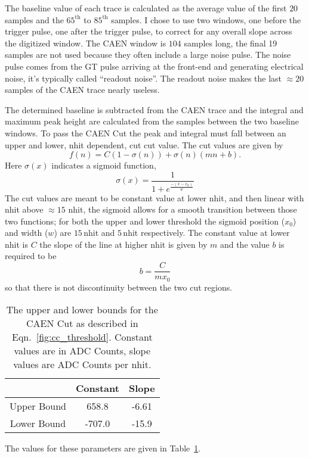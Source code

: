 The baseline value of each trace is calculated as the average value of the first
$20$ samples and the $65^{\text{th}}$ to $85^{\text{th}}$ samples.
I chose to use two windows, one before the trigger pulse, one after the trigger pulse, to
correct for any overall slope across the digitized window.
The CAEN window is $104$ samples long, the final 19 samples are not used because they often
include a large noise pulse.
The noise pulse comes from the GT pulse arriving at the front-end and generating electrical noise,
it's typically called ``readout noise''.
The readout noise makes the last $\approx20$ samples of the CAEN trace nearly
useless.

The determined baseline is subtracted from the CAEN trace and the integral and maximum
peak height are calculated from the samples between the two baseline windows.
To pass the CAEN Cut the peak and integral must fall between an upper and lower, nhit dependent,
cut cut value.
The cut values are given by
\begin{equation}
    f(n) = C\left(1-\sigma(n)\right) + \sigma(n)\left(mn+b\right)\text{.}
    \label{eqn:cc_threshold}
\end{equation}
Here $\sigma(x)$ indicates a sigmoid function,
\begin{equation}
    \sigma(x) = \frac{1}{1+e^{\frac{-(x-x_{0})}{w}}}
\end{equation}
The cut values are meant to be constant value at lower nhit, and then
linear with nhit above $\approx15$ nhit, the sigmoid allows for a smooth
transition between those two functions; for both the upper and lower threshold
the sigmoid position ($x_{0}$) and width ($w$) are $15$\,nhit and $5$\,nhit respectively.
The constant value at lower nhit is $C$ the slope of the line at higher nhit
is given by $m$ and the value $b$ is required to be
\begin{equation}
    b = \frac{C}{mx_{0}}
\end{equation}
so that there is not discontinuity between the two cut regions.
\begin{table}
    \centering
  \begin{tabular}{c | c c}
      & Constant & Slope  \\
      \hline
      Upper Bound & 658.8 & -6.61\\
      Lower Bound & -707.0 & -15.9\\
    \end{tabular}
    \caption[CAEN Cut Values]{The upper and lower bounds for the CAEN Cut as
    described in Eqn.~\eqref{fig:cc_threshold}.
    Constant values are in ADC Counts, slope values are ADC Counts per nhit.}
\label{tbl:caen_cut}
\end{table}
The values for these parameters are given in Table~\ref{tbl:caen_cut}.


